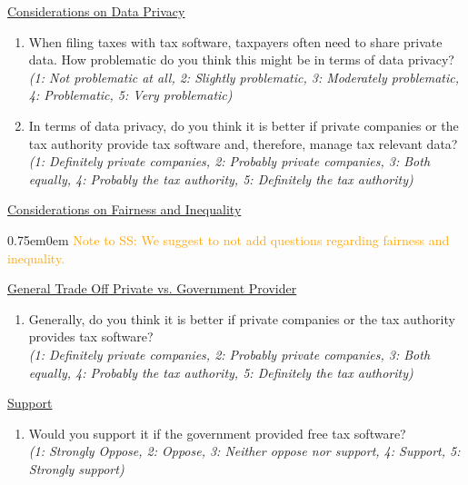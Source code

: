 \documentclass[11pt]{article}
\newcommand{\tk}[1]{\textcolor{orange}{#1}}
\begin{document}
\underline{Considerations on Data Privacy}
\begin{enumerate}[resume]
    \item When filing taxes with tax software, taxpayers often need to share private data. How problematic do you think this might be in terms of data privacy? \\
    \textit{(1: Not problematic at all, 2: Slightly problematic, 3: Moderately problematic, 4: Problematic, 5: Very problematic)}
    \item In terms of data privacy, do you think it is better if private companies or the tax authority provide tax software and, therefore, manage tax relevant data? \\
    \textit{(1: Definitely private companies, 2: Probably private companies, 3: Both equally, 4: Probably the tax authority, 5: Definitely the tax authority)}
\end{enumerate}
\underline{Considerations on Fairness and Inequality}
\vspace{0.5em}
\begin{adjustwidth}{0.75em}{0em} \tk{Note to SS: We suggest to not add questions regarding fairness and inequality.}\end{adjustwidth} 
\vspace{0.5em}
\underline{General Trade Off Private vs. Government Provider}
\begin{enumerate}[resume]
    \item Generally, do you think it is better if private companies or the tax authority provides tax software? \\
    \textit{(1: Definitely private companies, 2: Probably private companies, 3: Both equally, 4: Probably the tax authority, 5: Definitely the tax authority)}
\end{enumerate}
\underline{Support} \\
\begin{enumerate}[resume]
    \item Would you support it if the government provided free tax software?\\
    \textit{(1: Strongly Oppose, 2: Oppose, 3: Neither oppose nor support, 4: Support, 5: Strongly support)}
\end{enumerate}
\end{document}
